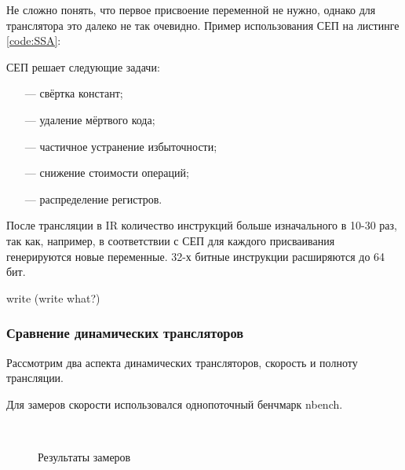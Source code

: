 Не сложно понять, что первое присвоение переменной не нужно, однако для транслятора это далеко не так очевидно. Пример использования СЕП на листинге \ref{code:SSA}:


СЕП решает следующие задачи:
\begin{itemize}[leftmargin=1.6\parindent]
	\item[---] свёртка констант;
	\item[---] удаление мёртвого кода;
	\item[---] частичное устранение избыточности;
	\item[---] снижение стоимости операций;
	\item[---] распределение регистров.
\end{itemize}

После трансляции в IR количество инструкций больше изначального в 10-30 раз, так как, например, в соответствии с СЕП для каждого присваивания генерируются новые переменные. 32-х битные инструкции расширяются до 64 бит.

write (write what?)

\subsubsection{Сравнение динамических трансляторов}

Рассмотрим два аспекта динамических трансляторов, скорость и полноту трансляции.

Для замеров скорости использовался однопоточный бенчмарк nbench.

\begin{figure}[hbtp]
	\centering
	\\
	\caption{Результаты замеров}
	\label{fig:speed}
\end{figure}

